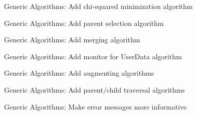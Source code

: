 
\begin{DoxyRefList}
\item[\label{todo__todo000001}%
\hypertarget{todo__todo000001}{}%
Namespace \hyperlink{namespace_h_a_l}{H\-A\-L} ]Generic Algorithms\-: Add chi-\/squared minimization algorithm 

Generic Algorithms\-: Add parent selection algorithm 

Generic Algorithms\-: Add merging algorithm 

Generic Algorithms\-: Add monitor for User\-Data algorithm 

Generic Algorithms\-: Add augmenting algorithms 

Generic Algorithms\-: Add parent/child traversal algorithms 

Generic Algorithms\-: Make error messages more informative 
\end{DoxyRefList}